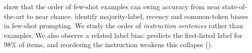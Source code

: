 \citet{lu2022fantastically} show that the order of few-shot examples can swing accuracy from near state-of-the-art to near chance. \citet{zhao2021calibrate} identify majority-label, recency and common-token biases in few-shot prompting. We study the order of \emph{instruction sentences} rather than examples. We also observe a related label bias: \llama predicts the first-listed label for 98\% of \agnews items, and reordering the instruction weakens this collapse ().
